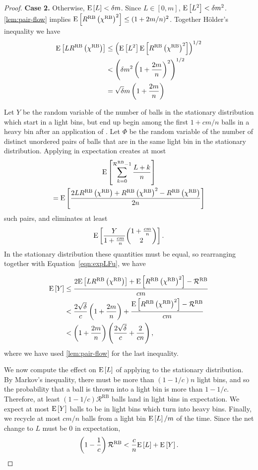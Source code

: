 \begin{proof}
\medskip 

{\bf Case 2.} Otherwise, $\mathrm{E}\left[L\right] < \delta m$. Since $L \in [0, m]$, $\mathrm{E}\left[L^2\right] <
	\delta m^2$. \cref{lem:pair-flow} implies $\mathrm{E}\left[R^\textrm{RB}\left(\chi^\textrm{RB}\right)^2\right] \le (1+2m/n)^2$. Together H\"{o}lder's inequality we have
\begin{align}
	\mathrm{E}\left[LR^\textrm{RB}\left(\chi^\textrm{RB}\right)\right]
	&\le \left(\mathrm{E}\left[L^2\right]\mathrm{E}\left[R^\textrm{RB}\left(\chi^\textrm{RB}\right)^2\right]\right)^{1/2} \nonumber \\
	&< \left(\delta m^2 \left(1+\frac{2m}{n}\right)^2\right)^{1/2} \nonumber\\
	&= \sqrt{\delta} m\left(1 + \frac{2m}{n}\right) \label{eqn:expLFu}
\end{align}

	Let $Y$ be the random variable of the number of balls in the stationary
	distribution which start in a light bins, but end up begin among the first
	$1 + cm/n$ balls in a heavy bin after an application of \RB.  Let $\Phi$
	be the random variable of the number of distinct unordered pairs of balls
	that are in the same light bin in the stationary distribution. Applying \RB
	in expectation creates at most
	\begin{multline*}
          \mathrm{E}\left[\sum_{k=0}^{\mathcal{R}^\textrm{RB}-1}\frac{L + k}{n}\right] \\
		  = \mathrm{E}\left[\frac{2LR^\textrm{RB}\left(\chi^\textrm{RB}\right) + R^\textrm{RB}\left(\chi^\textrm{RB}\right)^2 - R^\textrm{RB}\left(\chi^\textrm{RB}\right)}{2n}\right]
	\end{multline*}
	such pairs, and eliminates at least
	\[ \mathrm{E}\left[\frac{Y}{1+\frac{cm}{n}}\binom{1+\frac{cm}{n}}{2}\right].\]
	In the stationary distribution these quantities must be equal, so
	rearranging together with Equation~\eqref{eqn:expLFu}, we have
	
\begin{align*}
	\mathrm{E}\left[Y\right] 
	&\le \frac{2\mathrm{E}\left[LR^\textrm{RB}\left(\chi^\textrm{RB}\right)\right] + \mathrm{E}\left[R^\textrm{RB}\left(\chi^\textrm{RB}\right)^2\right] - \mathcal{R}^\textrm{RB}}{cm} \nonumber \\
	&< \frac{2\sqrt{\delta}}{c}\left(1+\frac{2m}{n}\right) + \frac{\mathrm{E}\left[R^\textrm{RB}\left(\chi^\textrm{RB}\right)^2\right] - \mathcal{R}^\textrm{RB}}{cm} \\
	&<\left(1+\frac{2m}{n}\right)\left(\frac{2\sqrt{\delta}}{c}+\frac{2}{cn}\right),  
\end{align*}
where we have used \cref{lem:pair-flow} for the last inequality.

We now compute the effect on $\mathrm{E}\left[L\right]$ of applying \RB to the stationary
distribution.  By Markov's inequality, there must be more than $(1-1/c)n$ light
bins, and so the probability that a ball is thrown into a light bin is more
than $1-1/c$. Therefore, at least $(1-1/c)\mathcal{R}^\textrm{RB}$ balls land
in light bins in expectation. We expect at most $\mathrm{E}\left[Y\right]$ balls to be in light
bins which turn into heavy bins. Finally, we recycle at most $cm/n$ balls from
a light bin $\mathrm{E}\left[L\right]/m$ of the time. Since the net change to $L$ must be $0$ in
expectation,
\[\left(1-\frac{1}{c}\right)\mathcal{R}^\textrm{RB} < \frac{c}{n}\mathrm{E}\left[L\right] + \mathrm{E}\left[Y\right].\]


\end{proof}
